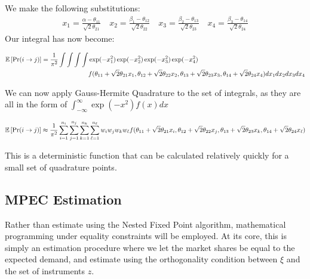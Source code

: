 \documentclass[12pt]{paper}
\begin{document}
We make the following substitutions:
\begin{align*}
  x_1 = \frac{\alpha-\theta_{11}}{\sqrt{2}\theta_{21}} \quad 
  x_2 = \frac{\beta_1-\theta_{12}}{\sqrt{2}\theta_{22}} \quad 
  x_3 = \frac{\beta_2-\theta_{13}}{\sqrt{2}\theta_{23}}\quad
  x_4 = \frac{\beta_3-\theta_{14}}{\sqrt{2}\theta_{24}}  
\end{align*}
Our integral has now become:

\begin{align*}
  \mathbb{E} \left [ \Pr( i \rightarrow j) \right ] = \frac{1}{\pi^2} \int \int \int \int &\exp(-x_1^2) \exp(-x_2^2)
                                              \exp(-x_3^2)\exp(-x_4^2)\\
  &f( \theta_{11} + \sqrt{2}\theta_{21}x_1, \theta_{12} +
                      \sqrt{2}\theta_{22}x_2, \theta_{13} + \sqrt{2}\theta_{23}x_3, \theta_{14} +
                      \sqrt{2}\theta_{24}x_4) dx_1 dx_2 dx_3 dx_4\\
\end{align*}

We can now apply Gauss-Hermite Quadrature to the set of integrals,
as they are all in the form of $\int_{-\infty}^{\infty} \exp( -x^2) f(x)dx$

\begin{equation*}
  \mathbb{E} \left [ \Pr( i \rightarrow j) \right ] \approx \frac{1}{\pi^2} \sum_{i=1}^{n_i} \sum_{j=1}^{n_j}
  \sum_{k=1}^{n_k} \sum_{\ell=1}^{n_{\ell}} w_i w_j w_k w_{\ell} f( \theta_{11} + \sqrt{2}\theta_{21}x_i, \theta_{12} +
  \sqrt{2}\theta_{22}x_j, \theta_{13} + \sqrt{2}\theta_{23}x_k, \theta_{14} +
  \sqrt{2}\theta_{24}x_\ell)
\end{equation*}

This is a deterministic function that can be calculated relatively
quickly for a small set of quadrature points. 


\subsection{MPEC Estimation}

Rather than estimate using the Nested Fixed Point algorithm,
mathematical programming under equality constraints will be
employed. At its core, this is simply an estimation procedure where we
let the market shares be equal to the expected demand, and estimate
using the orthogonality condition between $\xi$ and the set of
instruments $z$.
\end{document}
